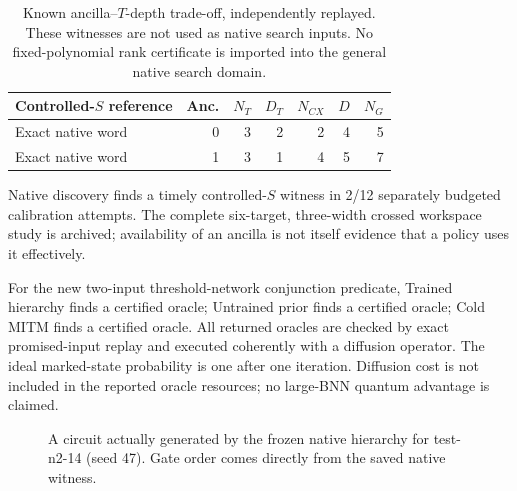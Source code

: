 \begin{table}[htbp]\centering\small\begin{tabular}{lrrrrrr}\toprule

Controlled-$S$ reference & Anc. & $N_T$ & $D_T$ & $N_{CX}$ & $D$ & $N_G$ \\ \midrule

Exact native word & 0 & 3 & 2 & 2 & 4 & 5 \\

Exact native word & 1 & 3 & 1 & 4 & 5 & 7 \\

\bottomrule\end{tabular}\caption{Known ancilla--$T$-depth trade-off, independently replayed. These witnesses are not used as native search inputs. No fixed-polynomial rank certificate is imported into the general native search domain.}\label{tab:cs}\end{table}

Native discovery finds a timely controlled-$S$ witness in 2/12 separately budgeted calibration attempts. The complete six-target, three-width crossed workspace study is archived; availability of an ancilla is not itself evidence that a policy uses it effectively.

For the new two-input threshold-network conjunction predicate, Trained hierarchy finds a certified oracle; Untrained prior finds a certified oracle; Cold MITM finds a certified oracle. All returned oracles are checked by exact promised-input replay and executed coherently with a diffusion operator. The ideal marked-state probability is one after one iteration. Diffusion cost is not included in the reported oracle resources; no large-BNN quantum advantage is claimed.

\begin{figure}[htbp]\centering\resizebox{\linewidth}{!}{}\caption{A circuit actually generated by the frozen native hierarchy for test-n2-14 (seed 47). Gate order comes directly from the saved native witness.}\label{fig:circuit}\end{figure}
